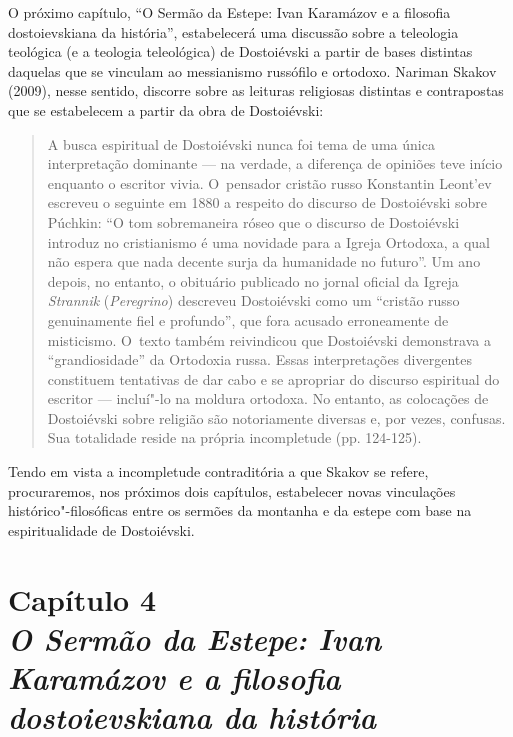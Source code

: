 O próximo capítulo, ``O Sermão da Estepe: Ivan Karamázov e a filosofia
dostoievskiana da história'', estabelecerá uma discussão sobre a
teleologia teológica (e a teologia teleológica) de Dostoiévski a partir
de bases distintas daquelas que se vinculam ao messianismo russófilo e
ortodoxo. Nariman Skakov (2009), nesse sentido, discorre sobre as
leituras religiosas distintas e contrapostas que se estabelecem a partir
da obra de Dostoiévski:

\begin{quote}
A busca espiritual de Dostoiévski nunca foi tema de uma única
interpretação dominante --- na verdade, a diferença de opiniões teve
início enquanto o escritor vivia. O~pensador cristão russo Konstantin
Leont'ev escreveu o seguinte em 1880 a respeito do discurso de
Dostoiévski sobre Púchkin: ``O tom sobremaneira róseo que o discurso de
Dostoiévski introduz no cristianismo é uma novidade para a Igreja
Ortodoxa, a qual não espera que nada decente surja da humanidade no
futuro''. Um ano depois, no entanto, o obituário publicado no jornal
oficial da Igreja \emph{Strannik} (\emph{Peregrino}) descreveu
Dostoiévski como um ``cristão russo genuinamente fiel e profundo'', que
fora acusado erroneamente de misticismo. O~texto também reivindicou que
Dostoiévski demonstrava a ``grandiosidade'' da Ortodoxia russa. Essas
interpretações divergentes constituem tentativas de dar cabo e se
apropriar do discurso espiritual do escritor --- incluí"-lo na moldura
ortodoxa. No entanto, as colocações de Dostoiévski sobre religião são
notoriamente diversas e, por vezes, confusas. Sua totalidade reside na
própria incompletude (pp. 124-125).
\end{quote}

Tendo em vista a incompletude contraditória a que Skakov se refere,
procuraremos, nos próximos dois capítulos, estabelecer novas vinculações
histórico"-filosóficas entre os sermões da montanha e da estepe com base
na espiritualidade de Dostoiévski.

\chapter*{Capítulo 4\\
\bigskip
\emph{O Sermão da Estepe: Ivan Karamázov e a filosofia dostoievskiana da
história}}


